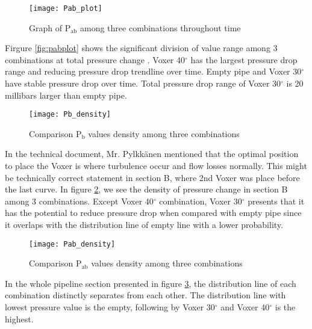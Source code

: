 \begin{figure}[h]
  \centering
  \texttt{[image: Pab\_plot]}
  \caption{ Graph of P$_{\text{ab}}$ among three combinations throughout time}
  \label{fig:pabplot}
\end{figure}

Firgure \vref{fig:pabplot} shows the significant division of value range among 3 combinations at total pressure change . Voxer 40$^{\circ}$  has the largest pressure drop range and reducing pressure drop trendline over time. Empty pipe and Voxer 30$^{\circ}$ have stable pressure drop over time. Total pressure drop range of Voxer 30$^{\circ}$ is 20 millibars larger than empty pipe. 

\begin{figure}[h]
  \centering
  \texttt{[image: Pb\_density]}
  \caption{ Comparison P$_{\text{b}}$ values density among three combinations}
  \label{fig:pbdensity}
\end{figure}

In the technical document, Mr. Pylkkänen mentioned that the optimal position to place the Voxer is where turbulence occur and flow losses normally. This might be technically correct statement in section B, where 2nd Voxer was place before the last curve. In figure \ref{fig:pbdensity}, we see the density of pressure change in section B among 3 combinations. Except Voxer 40$^{\circ}$ combination, Voxer 30$^{\circ}$ presents that it has the potential to reduce pressure drop when compared with empty pipe since it overlaps with the distribution line of empty line with a lower probability.  

\begin{figure}[h]
  \centering
  \texttt{[image: Pab\_density]}
  \caption{ Comparison P$_{\text{ab}}$ values density among three combinations}
  \label{fig:pabdensity}
\end{figure}

In the whole pipeline section presented in figure \ref{fig:pabdensity}, the distribution line of each combination distinctly separates from each other. The distribution line with lowest pressure value is the empty, following by Voxer 30$^{\circ}$ and Voxer 40$^{\circ}$  is the highest.
\clearpage %
